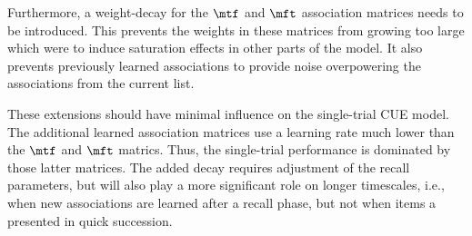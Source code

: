 Furthermore, a weight-decay for the $\mtf$ and $\mft$ association matrices needs to be introduced.
This prevents the weights in these matrices from growing too large which were to induce saturation effects in other parts of the model.
It also prevents previously learned associations to provide noise overpowering the associations from the current list.

These extensions should have minimal influence on the single-trial CUE model.
The additional learned association matrices use a learning rate much lower than the $\mtf$ and $\mft$ matrics.
Thus, the single-trial performance is dominated by those latter matrices.
The added decay requires adjustment of the recall parameters, but will also play a more significant role on longer timescales, i.e., when new associations are learned after a recall phase, but not when items a presented in quick succession.
